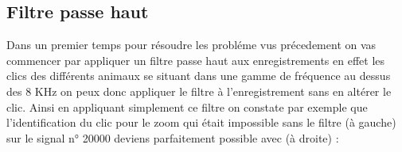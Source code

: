 \hypertarget{Filtre-passe-haut}{%
\subsection{Filtre passe haut}
\label{Filtre-passe-haut}}

Dans un premier temps pour résoudre les probléme vus précedement on  vas commencer par appliquer un filtre passe haut aux enregistrements en effet les clics des différents animaux se situant dans une gamme de fréquence au dessus des 8 KHz on peux donc appliquer le filtre à l'enregistrement sans en altérer le clic.
Ainsi en appliquant simplement ce filtre on constate par exemple que l'identification du clic pour le zoom qui était impossible sans le filtre (à gauche) sur le signal n° 20000 deviens parfaitement possible avec (à droite) :


